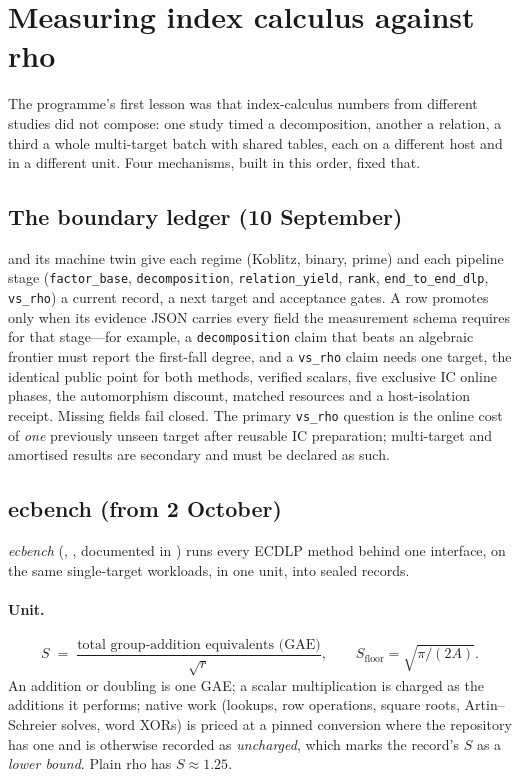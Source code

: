 \section{Measuring index calculus against rho}\label{sec:method}

The programme's first lesson was that index-calculus numbers from
different studies did not compose: one study timed a decomposition, another
a relation, a third a whole multi-target batch with shared tables, each on
a different host and in a different unit. Four mechanisms, built in this
order, fixed that.

\subsection{The boundary ledger (10 September)}

 and its machine twin
 give each regime (Koblitz, binary,
prime) and each pipeline stage (\texttt{factor\_base},
\texttt{decomposition}, \texttt{relation\_yield}, \texttt{rank},
\texttt{end\_to\_end\_dlp}, \texttt{vs\_rho}) a current record, a next
target and acceptance gates. A row promotes only when its evidence JSON
carries every field the measurement schema requires for that stage---for
example, a \texttt{decomposition} claim that beats an algebraic frontier
must report the first-fall degree, and a \texttt{vs\_rho} claim needs one
target, the identical public point for both methods, verified scalars,
five exclusive IC online phases, the automorphism discount, matched
resources and a host-isolation receipt. Missing fields fail closed. The
primary \texttt{vs\_rho} question is the online cost of \emph{one}
previously unseen target after reusable IC preparation; multi-target and
amortised results are secondary and must be declared as such.

\subsection{ecbench (from 2 October)}\label{sec:ecbench}

\emph{ecbench} (, ,
documented in ) runs every ECDLP method behind
one interface, on the same single-target workloads, in one unit, into
sealed records.

\paragraph{Unit.}
\[
  S \;=\; \frac{\text{total group-addition equivalents (GAE)}}{\sqrt r},
  \qquad
  S_{\text{floor}}=\sqrt{\pi/(2A)}.
\]
An addition or doubling is one GAE; a scalar multiplication is charged as
the additions it performs; native work (lookups, row operations, square
roots, Artin--Schreier solves, word XORs) is priced at a pinned conversion
where the repository has one and is otherwise recorded as
\emph{uncharged}, which marks the record's $S$ as a \emph{lower bound}.
Plain rho has $S\approx1.25$.

